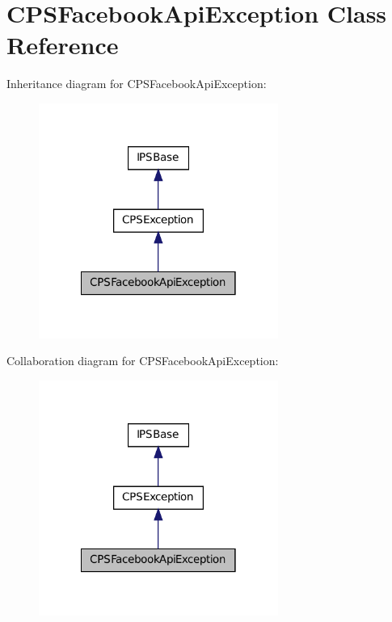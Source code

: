 \hypertarget{classCPSFacebookApiException}{
\section{CPSFacebookApiException Class Reference}
\label{classCPSFacebookApiException}
}


Inheritance diagram for CPSFacebookApiException:\nopagebreak
\begin{figure}[H]
\begin{center}
\leavevmode
\includegraphics[width=222pt]{classCPSFacebookApiException__inherit__graph}
\end{center}
\end{figure}


Collaboration diagram for CPSFacebookApiException:\nopagebreak
\begin{figure}[H]
\begin{center}
\leavevmode
\includegraphics[width=222pt]{classCPSFacebookApiException__coll__graph}
\end{center}
\end{figure}
